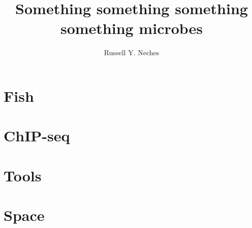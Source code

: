 \documentclass[PhD]{ucdavisthesis}
\title{Something something something something microbes}
\author{Russell Y. Neches}
\begin{document}
\makeintropages






\part{Fish}




\part{ChIP-seq}




\part{Tools}




\part{Space}



\end{document}
